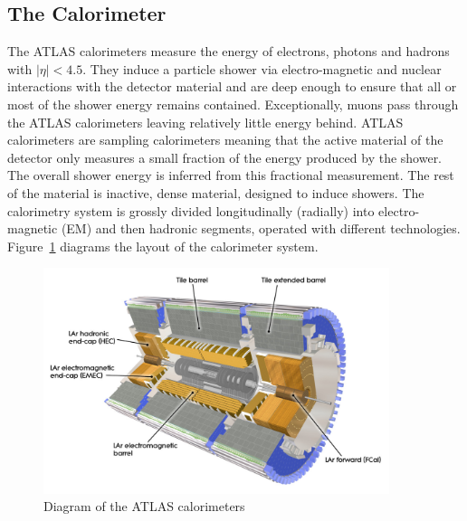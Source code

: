 \subsection{The Calorimeter}

The ATLAS calorimeters measure the energy of electrons, photons and hadrons with $|\eta|<4.5$. They induce a particle shower via electro-magnetic and nuclear interactions with the detector material and are deep enough to ensure that all or most of the shower energy remains contained. Exceptionally, muons pass through the ATLAS calorimeters leaving relatively little energy behind. ATLAS calorimeters are sampling calorimeters meaning that the active material of the detector only measures a small fraction of the energy produced by the shower. The overall shower energy is inferred from this fractional measurement. The rest of the material is inactive, dense material, designed to induce showers. The calorimetry system is grossly divided longitudinally (radially) into electro-magnetic (EM) and then hadronic segments, operated with different technologies. Figure~\ref{figure:lhc_calo} diagrams the layout of the calorimeter system.

\begin{figure}[!t]
\centering 
\includegraphics[width=0.9\textwidth]{figs/lhc/Calorimeter-eps-converted-to}
\caption{Diagram of the ATLAS calorimeters}
\label{figure:lhc_calo}
\end{figure}


